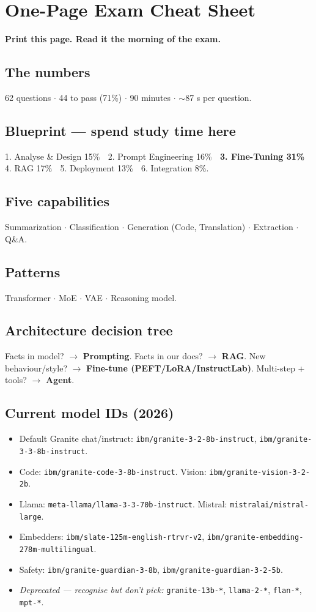 \chapter{One-Page Exam Cheat Sheet}
\label{app:cheatsheet}

\textbf{Print this page. Read it the morning of the exam.}

\section*{The numbers}
62 questions $\cdot$ 44 to pass (71\%) $\cdot$ 90 minutes $\cdot$ $\sim$87 s per question.

\section*{Blueprint --- spend study time here}
1. Analyse \& Design 15\% $\;$ 2. Prompt Engineering 16\% $\;$ \textbf{3. Fine-Tuning 31\%} $\;$ 4. RAG 17\% $\;$ 5. Deployment 13\% $\;$ 6. Integration 8\%.

\section*{Five capabilities}
Summarization $\cdot$ Classification $\cdot$ Generation (Code, Translation) $\cdot$ Extraction $\cdot$ Q\&A.

\section*{Patterns}
Transformer $\cdot$ MoE $\cdot$ VAE $\cdot$ Reasoning model.

\section*{Architecture decision tree}
Facts in model? $\to$ \textbf{Prompting}. Facts in our docs? $\to$ \textbf{RAG}. New behaviour/style? $\to$ \textbf{Fine-tune (PEFT/LoRA/InstructLab)}. Multi-step + tools? $\to$ \textbf{Agent}.

\section*{Current model IDs (2026)}
\begin{itemize}[leftmargin=*]
    \item Default Granite chat/instruct: \texttt{ibm/granite-3-2-8b-instruct}, \texttt{ibm/granite-3-3-8b-instruct}.
    \item Code: \texttt{ibm/granite-code-3-8b-instruct}. Vision: \texttt{ibm/granite-vision-3-2-2b}.
    \item Llama: \texttt{meta-llama/llama-3-3-70b-instruct}. Mistral: \texttt{mistralai/mistral-large}.
    \item Embedders: \texttt{ibm/slate-125m-english-rtrvr-v2}, \texttt{ibm/granite-embedding-278m-multilingual}.
    \item Safety: \texttt{ibm/granite-guardian-3-8b}, \texttt{ibm/granite-guardian-3-2-5b}.
    \item \emph{Deprecated --- recognise but don't pick:} \texttt{granite-13b-*}, \texttt{llama-2-*}, \texttt{flan-*}, \texttt{mpt-*}.
\end{itemize}

